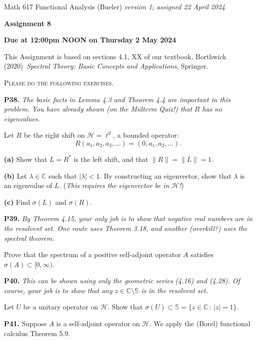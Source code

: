 \documentclass[12pt]{amsart}
\newcommand{\cH}{\mathcal{H}}
\newcommand{\CC}{\mathbb{C}}
\newcommand{\prob}[1]{\bigskip\noindent\textbf{#1.}\quad }
\newcommand{\epart}[1]{\medskip\noindent\textbf{(#1)}\quad }
\begin{document}
\scriptsize \noindent Math 617 Functional Analysis (Bueler) \hfill \emph{version 1; assigned 22 April 2024}
\normalsize\medskip

\Large\centerline{\textbf{Assignment 8}}
\large
\medskip

\centerline{\textbf{Due at 12:00pm NOON on Thursday 2 May 2024}}
\medskip
\normalsize

\thispagestyle{empty}

\bigskip
\noindent This Assignment is based on sections 4.1, XX of our textbook, Borthwick (2020)~\emph{Spectral Theory: Basic Concepts and Applications}, Springer.

\medskip
\noindent \textsc{Please do the following exercises.}
\smallskip

\renewcommand{\SS}{\mathbb{S}}


\prob{P38}  \emph{The basic facts in Lemma 4.3 and Theorem 4.4 are important in this problem.  You have already shown (on the Midterm Quiz!) that $R$ has no eigenvalues.}

\medskip\noindent Let $R$ be the right shift on $\cH=\ell^2$, a bounded operator:
	$$R (a_1,a_2,a_3,\dots) = (0,a_1,a_2,\dots).$$

\epart{a}  Show that $L=R^*$ is the left shift, and that $\|R\|=\|L\|=1$.

\epart{b}  Let $\lambda\in\CC$ such that $|\lambda|<1$.  By constructing an eigenvector, show that $\lambda$ is an eigenvalue of $L$.  (\emph{This requires the eigenvector be in $\cH$!})

\epart{c}  Find $\sigma(L)$ and $\sigma(R)$.


\prob{P39}  \emph{By Theorem 4.15, your only job is to show that negative real numbers are in the resolvent set.  One route uses Theorem 3.18, and another (overkill?) uses the spectral theorem.}

\medskip\noindent Prove that the spectrum of a positive self-adjoint operator $A$ satisfies $\sigma(A) \subset [0,\infty)$.


\prob{P40}  \emph{This can be shown using only the geometric series (4.16) and (4.28).  Of course, your job is to show that any $z\in\CC\setminus \SS$ is in the resolvent set.}

\medskip\noindent Let $U$ be a unitary operator on $\cH$.  Show that $\sigma(U) \subset \SS = \{z\in\CC\,:\,|z|=1\}$.


\prob{P41}  Suppose $A$ is a self-adjoint operator on $\cH$.  We apply the (Borel) functional calculus Theorem 5.9.
\end{document}
